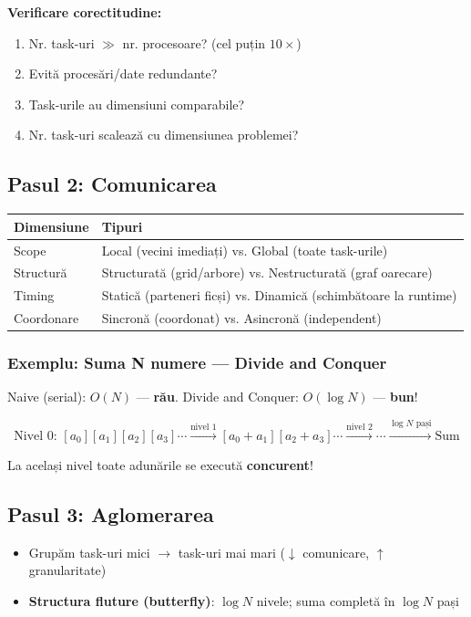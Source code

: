 \documentclass[a4paper,11pt]{article}
\newcommand{\thead}[1]{\cellcolor{tblheader}\color{white}\textbf{#1}}
\begin{document}
\textbf{Verificare corectitudine:}
\begin{enumerate}[noitemsep]
  \item Nr. task-uri $\gg$ nr. procesoare? (cel puțin $10\times$)
  \item Evită procesări/date redundante?
  \item Task-urile au dimensiuni comparabile?
  \item Nr. task-uri scalează cu dimensiunea problemei?
\end{enumerate}

\subsection{Pasul 2: Comunicarea}

\begin{center}
\begin{tabular}{ll}
\toprule
\thead{Dimensiune} & \thead{Tipuri} \\
\midrule
Scope & Local (vecini imediați) vs. Global (toate task-urile) \\
Structură & Structurată (grid/arbore) vs. Nestructurată (graf oarecare) \\
Timing & Statică (parteneri ficși) vs. Dinamică (schimbătoare la runtime) \\
Coordonare & Sincronă (coordonat) vs. Asincronă (independent) \\
\bottomrule
\end{tabular}
\end{center}

\subsubsection{Exemplu: Suma N numere — Divide and Conquer}

Naive (serial): $O(N)$ — \textbf{rău}. \quad Divide and Conquer: $O(\log N)$ — \textbf{bun}!

\[
\text{Nivel 0: } [a_0][a_1][a_2][a_3]\cdots \xrightarrow{\text{nivel 1}} [a_0+a_1][a_2+a_3]\cdots \xrightarrow{\text{nivel 2}} \cdots \xrightarrow{\log N \text{ pași}} \text{Sum}
\]

La același nivel toate adunările se execută \textbf{concurent}!

\subsection{Pasul 3: Aglomerarea}

\begin{itemize}[noitemsep]
  \item Grupăm task-uri mici $\to$ task-uri mai mari ($\downarrow$ comunicare, $\uparrow$ granularitate)
  \item \textbf{Structura fluture (butterfly)}: $\log N$ nivele; suma completă în $\log N$ pași
\end{itemize}
\end{document}
